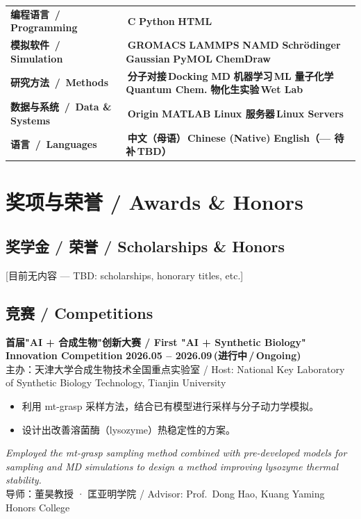 \documentclass[11pt,a4paper]{article}
\newcommand{\purplechip}[1]{\colorbox{njupurplelight}{\textcolor{njupurple}{\footnotesize\bfseries\,#1\,}}}
\newcommand{\bluechip}[1]{\colorbox{njubluelight}{\textcolor{njublue}{\footnotesize\bfseries\,#1\,}}}
\newcommand{\cvdateinline}[1]{{\color{njublue}\small\bfseries #1}}
\newcommand{\muted}[1]{{\color{mutedgray}\small #1}}
\begin{document}
\noindent\begin{tabularx}{\textwidth}{@{}p{3.2cm} X@{}}
\textbf{\small 编程语言 \,/\, Programming} & \purplechip{C}\;\purplechip{Python}\;\purplechip{HTML} \\[3pt]
\textbf{\small 模拟软件 \,/\, Simulation} & \bluechip{GROMACS}\;\bluechip{LAMMPS}\;\bluechip{NAMD}\;\bluechip{Schrödinger}\;\bluechip{Gaussian}\;\bluechip{PyMOL}\;\bluechip{ChemDraw} \\[3pt]
\textbf{\small 研究方法 \,/\, Methods} & \purplechip{分子对接\,Docking}\;\purplechip{MD}\;\purplechip{机器学习\,ML}\;\purplechip{量子化学\,Quantum Chem.}\;\purplechip{物化生实验\,Wet Lab} \\[3pt]
\textbf{\small 数据与系统 \,/\, Data \& Systems} & \bluechip{Origin}\;\bluechip{MATLAB}\;\bluechip{Linux 服务器\,Linux Servers} \\[3pt]
\textbf{\small 语言 \,/\, Languages} & \bluechip{中文（母语）\,Chinese (Native)}\;\bluechip{English（--- 待补\,TBD）} \\
\end{tabularx}

\section*{奖项与荣誉 \quad / \quad Awards \& Honors}

\subsection*{奖学金 / 荣誉 \;/\; Scholarships \& Honors}
\muted{[目前无内容 --- TBD: scholarships, honorary titles, etc.]}

\subsection*{竞赛 \;/\; Competitions}
\begin{compcard}
{\bfseries 首届"AI + 合成生物"创新大赛 \;/\; First "AI + Synthetic Biology" Innovation Competition} \hfill \cvdateinline{2026.05 -- 2026.09\,(进行中\,/\,Ongoing)}\\[2pt]
{\small\muted{主办：天津大学合成生物技术全国重点实验室 \;/\; Host: National Key Laboratory of Synthetic Biology Technology, Tianjin University}}\\[2pt]
\begin{itemize}
  \item 利用 mt-grasp 采样方法，结合已有模型进行采样与分子动力学模拟。
  \item 设计出改善溶菌酶（lysozyme）热稳定性的方案。
\end{itemize}
{\itshape\small Employed the mt-grasp sampling method combined with pre-developed models for sampling and MD simulations to design a method improving lysozyme thermal stability.}\\[2pt]
{\small\muted{导师：董昊教授 · 匡亚明学院 \;/\; Advisor: Prof.\ Dong Hao, Kuang Yaming Honors College}}
\end{compcard}
\end{document}

